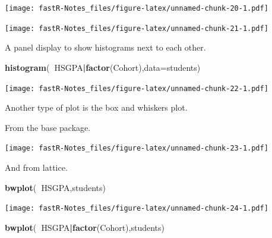\documentclass[]{book}
\newenvironment{Shaded}{\begin{snugshade}}{\end{snugshade}}
\newcommand{\KeywordTok}[1]{\textcolor[rgb]{0.13,0.29,0.53}{\textbf{#1}}}
\newcommand{\DataTypeTok}[1]{\textcolor[rgb]{0.13,0.29,0.53}{#1}}
\newcommand{\StringTok}[1]{\textcolor[rgb]{0.31,0.60,0.02}{#1}}
\newcommand{\OperatorTok}[1]{\textcolor[rgb]{0.81,0.36,0.00}{\textbf{#1}}}
\newcommand{\NormalTok}[1]{#1}
\theoremstyle{definition}
\theoremstyle{definition}
\theoremstyle{definition}
\theoremstyle{remark}
\begin{document}
\texttt{[image: fastR-Notes\_files/figure-latex/unnamed-chunk-20-1.pdf]}

\begin{Shaded}
\end{Shaded}

\texttt{[image: fastR-Notes\_files/figure-latex/unnamed-chunk-21-1.pdf]}

A panel display to show histograms next to each other.

\begin{Shaded}
\begin{Highlighting}[]
\KeywordTok{histogram}\NormalTok{(}\OperatorTok{~}\NormalTok{HSGPA}\OperatorTok{|}\KeywordTok{factor}\NormalTok{(Cohort),}\DataTypeTok{data=}\NormalTok{students)}
\end{Highlighting}
\end{Shaded}

\texttt{[image: fastR-Notes\_files/figure-latex/unnamed-chunk-22-1.pdf]}

Another type of plot is the box and whiskers plot.

From the base package.

\begin{Shaded}
\end{Shaded}

\texttt{[image: fastR-Notes\_files/figure-latex/unnamed-chunk-23-1.pdf]}

And from lattice.

\begin{Shaded}
\begin{Highlighting}[]
\KeywordTok{bwplot}\NormalTok{(}\OperatorTok{~}\NormalTok{HSGPA,students)}
\end{Highlighting}
\end{Shaded}

\texttt{[image: fastR-Notes\_files/figure-latex/unnamed-chunk-24-1.pdf]}

\begin{Shaded}
\begin{Highlighting}[]
\KeywordTok{bwplot}\NormalTok{(}\OperatorTok{~}\NormalTok{HSGPA}\OperatorTok{|}\KeywordTok{factor}\NormalTok{(Cohort),students)}
\end{Highlighting}
\end{Shaded}
\end{document}
